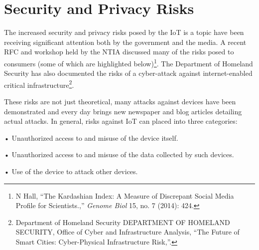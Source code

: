 \section{Security and Privacy Risks}

The increased security and privacy risks posed by the IoT is a topic
have been receiving significant attention both by the government and the
media. A recent RFC and workshop held by the NTIA discussed many of the
risks posed to consumers (some of which are highlighted below)\footnote{N
  Hall, ``The Kardashian Index: A Measure of Discrepant Social Media
  Profile for Scientists.,'' \emph{Genome Biol} 15, no. 7 (2014): 424.}.
The Department of Homeland Security has also documented the risks of a
cyber-attack against internet-enabled critical infrastructure\footnote{Department
  of Homeland Security DEPARTMENT OF HOMELAND SECURITY, Office of Cyber
  and Infrastructure Analysis, ``The Future of Smart Cities:
  Cyber-Physical Infrastructure Risk,''.}.

These risks are not just theoretical, many attacks against devices have
been demonstrated and every day brings new newspaper and blog articles
detailing actual attacks. In general, risks against IoT can placed into
three categories:

• Unauthorized access to and misuse of the device itself.

• Unauthorized access to and misuse of the data collected by such
devices.

• Use of the device to attack other devices.